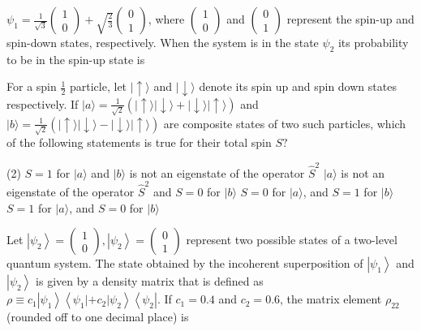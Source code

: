 \begin{enumerate}
\begin{minipage}{\textwidth}
	$\psi_{1}=\frac{1}{\sqrt{3}}\left(\begin{array}{l}1 \\ 0\end{array}\right)+\sqrt{\frac{2}{3}}\left(\begin{array}{l}0 \\ 1\end{array}\right)$, where $\left(\begin{array}{l}1 \\ 0\end{array}\right)$ and $\left(\begin{array}{l}0 \\ 1\end{array}\right)$ represent the spin-up and spin-down states, respectively. When the system is in the state $\psi_{2}$ its probability to be in the spin-up state is
\end{minipage}
\begin{minipage}{\textwidth}
	\item For a spin $\frac{1}{2}$ particle, let $|\uparrow\rangle$ and $|\downarrow\rangle$ denote its spin up and spin down states respectively. If $|a\rangle=\frac{1}{\sqrt{2}}(|\uparrow\rangle|\downarrow\rangle+|\downarrow\rangle|\uparrow\rangle)$ and $|b\rangle=\frac{1}{\sqrt{2}}(|\uparrow\rangle|\downarrow\rangle-|\downarrow\rangle|\uparrow\rangle)$ are composite states of two such particles, which of the following statements is true for their total spin $S ?$
\end{minipage}
\begin{tasks}(2)
	\task[\textbf{A.}] $S=1$ for $|a\rangle$ and $|b\rangle$ is not an eigenstate of the operator $\hat{S}^{2}$
	\task[\textbf{B.}]$|a\rangle$ is not an eigenstate of the operator $\hat{S}^{2}$ and $S=0$ for $|b\rangle$
	\task[\textbf{C.}]$S=0$ for $|a\rangle$, and $S=1$ for $|b\rangle$
	\task[\textbf{D.}]$S=1$ for $|a\rangle$, and $S=0$ for $|b\rangle$
\end{tasks}
\begin{minipage}{\textwidth}
	\item Let $\left|\psi_{2}\right\rangle=\left(\begin{array}{c}1 \\ 0\end{array}\right),\left|\psi_{2}\right\rangle=\left(\begin{array}{c}0 \\ 1\end{array}\right)$ represent two possible states of a two-level quantum system. The state obtained by the incoherent superposition of $\left|\psi_{1}\right\rangle$ and $\left|\psi_{2}\right\rangle$ is given by a density matrix that is defined as $\rho \equiv c_{1}\left|\psi_{1}\right\rangle\left\langle\psi_{1}\left|+c_{2}\right| \psi_{2}\right\rangle\left\langle\psi_{2}\right| .$ If $c_{1}=0.4$ and $c_{2}=0.6$, the matrix element $\rho_{22}$ (rounded off to one decimal place) is
\end{minipage}
\end{enumerate}
